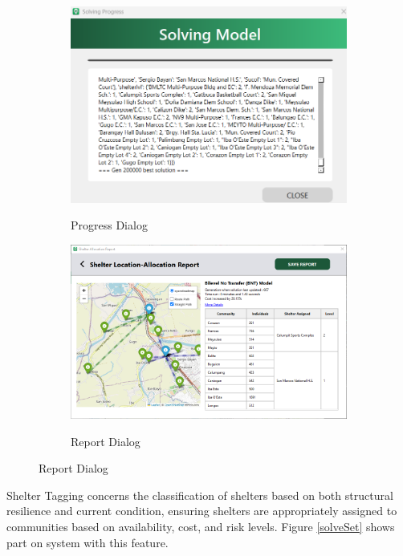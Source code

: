 \documentclass[11pt,letterpaper,]{article}
\begin{document}
	\begin{figure}[h!]
		\centering
		\caption{Data Simulation UI}
		
		\begin{subfigure}{0.45\textwidth}
			\caption{Progress Dialog}
			\centering
			\includegraphics[width=\textwidth]{Chapter 4/progress}
			\label{solveProg}
		\end{subfigure}
		\hspace{0.5cm}
		\begin{subfigure}{0.45\textwidth}
			\caption{Report Dialog}
			\centering
			\includegraphics[width=\textwidth]{Chapter 4/alloc report}
			\label{shelAllocRep}
		\end{subfigure}
		
	\end{figure}
	
	Shelter Tagging concerns the classification of shelters based on both structural resilience and current condition, ensuring shelters are appropriately assigned to communities based on availability, cost, and risk levels. Figure \ref{solveSet} shows part on system with this feature.
	
\end{document}
